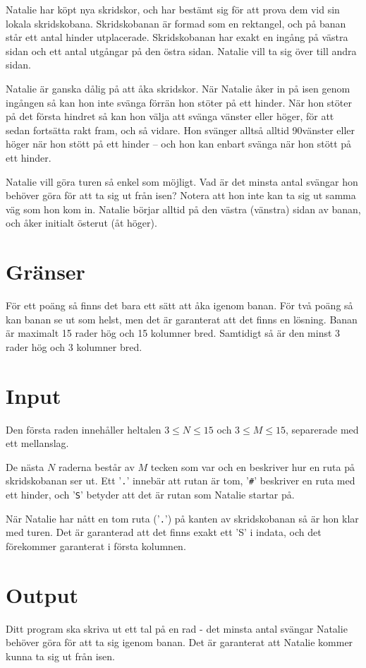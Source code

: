 Natalie har köpt nya skridskor, och har bestämt sig för att prova dem vid sin
lokala skridskobana. Skridskobanan är formad som en rektangel, och på banan
står ett antal hinder utplacerade. Skridskobanan har exakt en ingång på västra
sidan och ett antal utgångar på den östra sidan. Natalie vill ta sig över till
andra sidan.

Natalie är ganska dålig på att åka skridskor. När Natalie åker in på isen
genom ingången så kan hon inte svänga förrän hon stöter på ett hinder. När hon
stöter på det första hindret så kan hon välja att svänga vänster eller höger,
för att sedan fortsätta rakt fram, och så vidare. Hon svänger alltså alltid
90\textdegree vänster eller höger när hon stött på ett hinder -- och hon kan enbart svänga
när hon stött på ett hinder.

Natalie vill göra turen så enkel som möjligt. Vad är det minsta antal svängar
hon behöver göra för att ta sig ut från isen? Notera att hon inte kan ta sig ut
samma väg som hon kom in. Natalie börjar alltid på den västra (vänstra) sidan
av banan, och åker initialt österut (åt höger).

\section*{Gränser}
För ett poäng så finns det bara ett sätt att åka igenom banan. För två poäng så
kan banan se ut som helst, men det är garanterat att det finns en lösning. Banan
är maximalt 15 rader hög och 15 kolumner bred. Samtidigt så är den minst 3 rader hög
och 3 kolumner bred.

\section*{Input}
Den första raden innehåller heltalen $3 \le N \le 15$ och $3 \le M \le 15$,
separerade med ett mellanslag.

De nästa $N$ raderna består av $M$ tecken som var och en beskriver hur en ruta
på skridskobanan ser ut. Ett '\texttt{.}' innebär att rutan är tom,
'\texttt{\#}' beskriver en ruta med ett hinder, och '\texttt{S}' betyder att det är
rutan som Natalie startar på.

När Natalie har nått en tom ruta ('\texttt{.}') på kanten av skridskobanan så
är hon klar med turen. Det är garanterad att det finns exakt ett 'S' i indata,
och det förekommer garanterat i första kolumnen.

\section*{Output}
Ditt program ska skriva ut ett tal på en rad - det minsta antal svängar Natalie
behöver göra för att ta sig igenom banan. Det är garanterat att Natalie kommer kunna
ta sig ut från isen.

